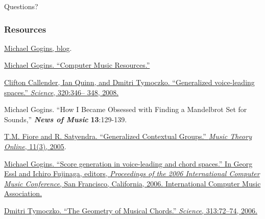 \documentclass{beamer}
\begin{document}
\begin{frame}{Questions?}

\end{frame}


\begin{frame}[allowframebreaks]
  \frametitle<presentation>{Resources}
    
  \begin{thebibliography}{10}
    
  \beamertemplatebookbibitems

   \href{http://michaelgogins.tumblr.com/}{Michael Gogins, blog}.
  
   \href{https://github.com/gogins/gogins.github.io}{Michael Gogins. ``Computer Music Resources.''}

   \href{http://www.sciencemag.org/content/320/5874/346.abstract}{Clifton Callender, Ian Quinn, and Dmitri Tymoczko. ``Generalized voice-leading spaces.'' \emph{Science}, 320:346–
348, 2008.}

   {Michael Gogins. ``How I Became Obsessed with Finding a Mandelbrot Set for Sounds,'' \textbf{\textit{News of Music}} \textbf{13}:129-139.}

   \href{http://www.mtosmt.org/issues/mto.05.11.3/mto.05.11.3.fiore_satyendra.pdf}{T.M. Fiore and R. Satyendra. ``Generalized Contextual
Groups.'' \emph{Music Theory Online}, 11(3), 2005}.

    \href{https://www.dropbox.com/s/ztej71n2fbn4tq4/Lindenmayer_Systems_Based_on_Riemannian_Transformations.pdf}{Michael Gogins. ``Score generation in voice-leading
and chord spaces.'' In Georg Essl and Ichiro Fujinaga,
editors, \emph{Proceedings of the 2006 International Computer Music Conference}, San Francisco, California,
2006. International Computer Music Association.}

   \href{http://www.sciencemag.org/content/313/5783/72.abstract?ijkey=wzKBea3ktKdu2&keytype=ref&siteid=sci}{Dmitri Tymoczko. ``The Geometry of Musical Chords.'' \emph{Science}, 313:72–74, 2006.}

  \end{thebibliography}

\end{frame}
\end{document}
